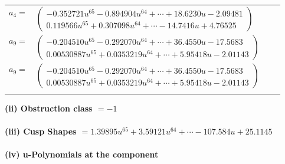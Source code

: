 \documentclass[1p]{elsarticle_modified}
\theoremstyle{definition}
\begin{document}
\begin{tabular}{m{7pt} m{180pt} m{7pt} m{180pt} }
\flushright $a_{4}=$&$\begin{pmatrix}-0.352721 u^{65}-0.894904 u^{64}+\cdots+18.6230 u-2.09481\\0.119566 u^{65}+0.307098 u^{64}+\cdots-14.7416 u+4.76525\end{pmatrix}$ \\
\flushright $a_{9}=$&$\begin{pmatrix}-0.204510 u^{65}-0.292070 u^{64}+\cdots+36.4550 u-17.5683\\0.00530887 u^{65}+0.0353219 u^{64}+\cdots+5.95418 u-2.01143\end{pmatrix}$\\ \flushright $a_{9}=$&$\begin{pmatrix}-0.204510 u^{65}-0.292070 u^{64}+\cdots+36.4550 u-17.5683\\0.00530887 u^{65}+0.0353219 u^{64}+\cdots+5.95418 u-2.01143\end{pmatrix}$\\&\end{tabular}
\flushleft \textbf{(ii) Obstruction class $= -1$}\\~\\
\flushleft \textbf{(iii) Cusp Shapes $= 1.39895 u^{65}+3.59121 u^{64}+\cdots-107.584 u+25.1145$}\\~\\
\newpage\renewcommand{\arraystretch}{1}
\flushleft \textbf{(iv) u-Polynomials at the component}\newline \\
\end{document}
